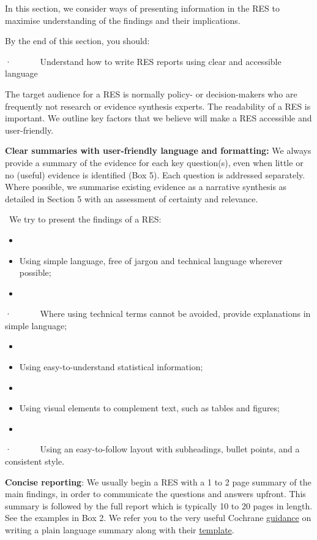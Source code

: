 \documentclass[
  letterpaper,
  DIV=11,
  numbers=noendperiod]{scrreprt}
\begin{document}
In this section, we consider ways of presenting information in the RES
to maximise understanding of the findings and their implications.

By the end of this section, you should:

·~~~~~~ Understand how to write RES reports using clear and accessible
language

The target audience for a RES is normally policy- or decision-makers who
are frequently not research or evidence synthesis experts. The
readability of a RES is important. We outline key factors that we
believe will make a RES accessible and user-friendly.

\textbf{Clear summaries with user-friendly language and formatting:} We
always provide a summary of the evidence for each key question(s), even
when little or no (useful) evidence is identified (Box 5). Each question
is addressed separately. Where possible, we summarise existing evidence
as a narrative synthesis as detailed in Section 5 with an assessment of
certainty and relevance.

~We try to present the findings of a RES:

\begin{itemize}
\item
\item
  Using simple language, free of jargon and technical language wherever
  possible;
\item
\end{itemize}

·~~~~~~ Where using technical terms cannot be avoided, provide
explanations in simple language;

\begin{itemize}
\item
\item
  Using easy-to-understand statistical information;
\item
\item
  Using visual elements to complement text, such as tables and figures;
\item
\end{itemize}

·~~~~~~ Using an easy-to-follow layout with subheadings, bullet points,
and a consistent style.

\textbf{Concise reporting}: We usually begin a RES with a 1 to 2 page
summary of the main findings, in order to communicate the questions and
answers upfront. This summary is followed by the full report which is
typically 10 to 20 pages in length. See the examples in Box 2. We refer
you to the very useful Cochrane
\href{https://training.cochrane.org/system/files/uploads/protected_file/GUIDAN~1.PDF\#page=8}{guidance}
on writing a plain language summary along with their
\href{https://view.officeapps.live.com/op/view.aspx?src=https\%3A\%2F\%2Fwww.cochrane.org\%2Fauthors\%2Fhandbooks-and-manuals\%2Fhandbook\%2Fcurrent\%2Ftemplate-writing-cochrane-plain-language-summary.docx&wdOrigin=BROWSELINK}{template}.
\end{document}
